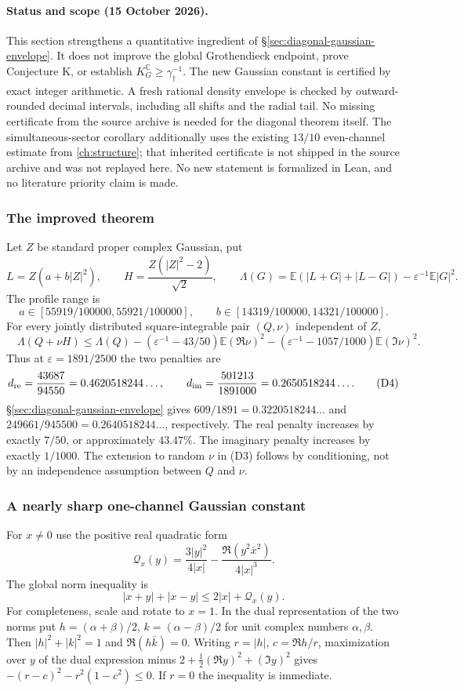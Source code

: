 \paragraph{Status and scope (15 October 2026).}
This section strengthens a quantitative ingredient of \S\ref{sec:diagonal-gaussian-envelope}.
It does not improve the global Grothendieck endpoint, prove Conjecture K, or establish
$K_G^{\mathbb C}\ge\gamma_\dagger^{-1}$.
The new Gaussian constant is certified by exact integer arithmetic.
A fresh rational density envelope is checked by outward-rounded decimal intervals,
including all shifts and the radial tail. No missing certificate from the source archive
is needed for the diagonal theorem itself.
The simultaneous-sector corollary additionally uses the existing $13/10$ even-channel
estimate from \autoref{ch:structure}; that inherited certificate is not shipped
in the source archive and was not replayed here.
No new statement is formalized in Lean, and no literature priority claim is made.

\subsubsection{The improved theorem}
Let $Z$ be standard proper complex Gaussian, put
\[
 L=Z(a+b|Z|^2),\qquad H=\frac{Z(|Z|^2-2)}{\sqrt2},
 \qquad
 \Lambda(G)=\mathbb E(|L+G|+|L-G|)
       -\varepsilon^{-1}\mathbb E|G|^2.
 \tag{D1}
\]
The profile range is
\[
 a\in[55919/100000,55921/100000],\qquad
 b\in[14319/100000,14321/100000].
 \tag{D2}
\]
For every jointly distributed square-integrable pair $(Q,\nu)$ independent of $Z$,
\[
\boxed{\quad
 \Lambda(Q+\nu H)\le\Lambda(Q)
 -(\varepsilon^{-1}-43/50)\mathbb E(\Re\nu)^2
 -(\varepsilon^{-1}-1057/1000)\mathbb E(\Im\nu)^2.
 \quad}
 \tag{D3}
\]
Thus at $\varepsilon=1891/2500$ the two penalties are
\[
 d_{\rm re}=\frac{43687}{94550}=0.4620518244\ldots,\qquad
 d_{\rm im}=\frac{501213}{1891000}=0.2650518244\ldots.
 \tag{D4}
\]
\S\ref{sec:diagonal-gaussian-envelope} gives $609/1891=0.3220518244\ldots$
and $249661/945500=0.2640518244\ldots$, respectively.
The real penalty increases by exactly $7/50$, or approximately $43.47\%$.
The imaginary penalty increases by exactly $1/1000$.
The extension to random $\nu$ in (D3) follows by conditioning, not by an
independence assumption between $Q$ and $\nu$.

\subsubsection{A nearly sharp one-channel Gaussian constant}
For $x\ne0$ use the positive real quadratic form
\[
 \mathcal Q_x(y)=\frac{3|y|^2}{4|x|}
       -\frac{\Re(y^2\bar x^2)}{4|x|^3}.
 \tag{D5}
\]
The global norm inequality is
\[
 |x+y|+|x-y|\le2|x|+\mathcal Q_x(y).
 \tag{D6}
\]
For completeness, scale and rotate to $x=1$. In the dual representation of
the two norms put $h=(\alpha+\beta)/2$, $k=(\alpha-\beta)/2$ for unit
complex numbers $\alpha,\beta$. Then $|h|^2+|k|^2=1$ and $\Re(h\bar k)=0$.
Writing $r=|h|$, $c=\Re h/r$, maximization over $y$ of the dual expression
minus $2+\frac12(\Re y)^2+(\Im y)^2$ gives
$-(r-c)^2-r^2(1-c^2)\le0$. If $r=0$ the inequality is immediate.

